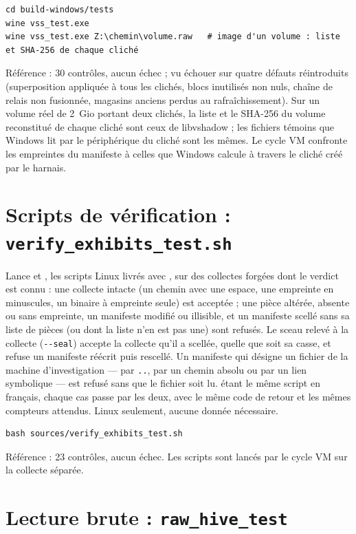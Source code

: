 \documentclass[11pt,a4paper,oneside]{report}
\begin{document}
\begin{lstlisting}
cd build-windows/tests
wine vss_test.exe
wine vss_test.exe Z:\chemin\volume.raw   # image d'un volume : liste et SHA-256 de chaque cliché
\end{lstlisting}

Référence : 30 contrôles, aucun échec ; vu échouer sur quatre défauts
réintroduits (superposition appliquée à tous les clichés, blocs inutilisés non
nuls, chaîne de relais non fusionnée, magasins anciens perdus au
rafraîchissement). Sur un volume réel de 2~Gio portant deux clichés, la liste
et le SHA-256 du volume reconstitué de chaque cliché sont ceux de libvshadow ;
les fichiers témoins que Windows lit par le périphérique du cliché sont les
mêmes. Le cycle VM confronte les empreintes du manifeste à celles que Windows
calcule à travers le cliché créé par le harnais.

\section{Scripts de vérification : \texttt{verify\_exhibits\_test.sh}}

Lance  et , les
scripts Linux livrés avec , sur des collectes forgées dont le
verdict est connu : une collecte intacte (un chemin avec une espace, une
empreinte en minuscules, un binaire à empreinte seule) est acceptée ; une pièce
altérée, absente ou sans empreinte, un manifeste modifié ou illisible, et un
manifeste scellé sans sa liste de pièces (ou dont la liste n'en est pas une)
sont refusés. Le sceau relevé à la collecte (\texttt{-{}-seal}) accepte la
collecte qu'il a scellée, quelle que soit sa casse, et refuse un manifeste
réécrit puis rescellé. Un manifeste qui désigne un fichier de la machine d'investigation —
par \texttt{..}, par un chemin absolu ou par un lien symbolique — est refusé
sans que le fichier soit lu.  étant le même
script en français, chaque cas passe par les deux, avec le même code de retour
et les mêmes compteurs attendus. Linux seulement, aucune donnée nécessaire.

\begin{lstlisting}
bash sources/verify_exhibits_test.sh
\end{lstlisting}

Référence : 23 contrôles, aucun échec. Les scripts  sont lancés
par le cycle VM sur la collecte séparée.

\section{Lecture brute : \texttt{raw\_hive\_test}}
\end{document}
